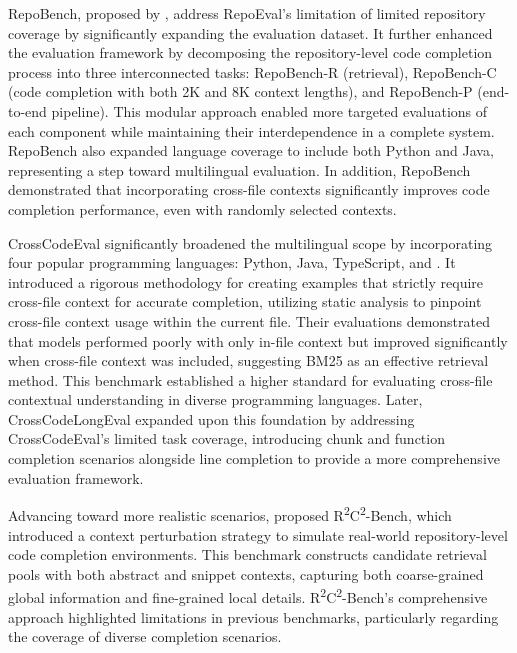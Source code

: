 RepoBench, proposed by \citet{liu2023}, address RepoEval's limitation of limited repository coverage by significantly expanding the evaluation dataset. It further enhanced the evaluation framework by decomposing the repository-level code completion process into three interconnected tasks: RepoBench-R (retrieval), RepoBench-C (code completion with both 2K and 8K context lengths), and RepoBench-P (end-to-end pipeline). This modular approach enabled more targeted evaluations of each component while maintaining their interdependence in a complete system. RepoBench also expanded language coverage to include both Python and Java, representing a step toward multilingual evaluation. In addition, RepoBench demonstrated that incorporating cross-file contexts significantly improves code completion performance, even with randomly selected contexts.

CrossCodeEval \parencite{ding2023} significantly broadened the multilingual scope by incorporating four popular programming languages: Python, Java, TypeScript, and \Csh. It introduced a rigorous methodology for creating examples that strictly require cross-file context for accurate completion, utilizing static analysis to pinpoint cross-file context usage within the current file. Their evaluations demonstrated that models performed poorly with only in-file context but improved significantly when cross-file context was included, suggesting BM25 \parencite{robertson2009} as an effective retrieval method. This benchmark established a higher standard for evaluating cross-file contextual understanding in diverse programming languages. Later, CrossCodeLongEval \parencite{wu2024a} expanded upon this foundation by addressing CrossCodeEval's limited task coverage, introducing chunk and function completion scenarios alongside line completion to provide a more comprehensive evaluation framework.

Advancing toward more realistic scenarios, \citet{deng2024} proposed R\textsuperscript{2}C\textsuperscript{2}-Bench, which introduced a context perturbation strategy to simulate real-world repository-level code completion environments. This benchmark constructs candidate retrieval pools with both abstract and snippet contexts, capturing both coarse-grained global information and fine-grained local details. R\textsuperscript{2}C\textsuperscript{2}-Bench's comprehensive approach highlighted limitations in previous benchmarks, particularly regarding the coverage of diverse completion scenarios.

